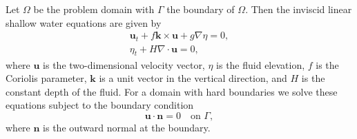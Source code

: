 Let $\Omega$ be the problem domain with $\Gamma$ the boundary of $\Omega$.
Then the inviscid linear shallow water equations are given by
\cite{Hanert2004, LeBlond1981, Le-Roux1998}
\begin{equation}
  \begin{split}
    \mathbf{u}_t + f\mathbf{k} \times \mathbf{u} + g \nabla \eta = 0, \\
    \eta_t + H \nabla\cdot \mathbf{u} = 0,
  \end{split}
  \label{eqn:SWE}
\end{equation}
where $\mathbf{u}$ is the two-dimensional velocity vector, $\eta$ is the
fluid elevation, $f$ is the Coriolis parameter, $\mathbf{k}$ is a unit
vector in the vertical direction, and $H$ is the constant depth of the fluid.
For a domain with hard boundaries we solve these equations subject to the
boundary condition
\begin{equation}
  \mathbf{u}\cdot \mathbf{n} = 0 \quad \text{on } \Gamma,
  \label{eqn:BCs}
\end{equation}
where $\mathbf{n}$ is the outward normal at the boundary.

